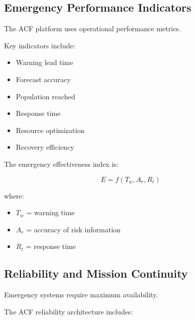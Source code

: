 
\subsection{Emergency Performance Indicators}

The ACF platform uses operational performance metrics.

Key indicators include:

\begin{itemize}

\item Warning lead time

\item Forecast accuracy

\item Population reached

\item Response time

\item Resource optimization

\item Recovery efficiency

\end{itemize}


The emergency effectiveness index is:

\[
E=
f(T_w,A_r,R_t)
\]


where:

\begin{itemize}

\item $T_w$ = warning time

\item $A_r$ = accuracy of risk information

\item $R_t$ = response time

\end{itemize}



\subsection{Reliability and Mission Continuity}

Emergency systems require maximum availability.

The ACF reliability architecture includes:

